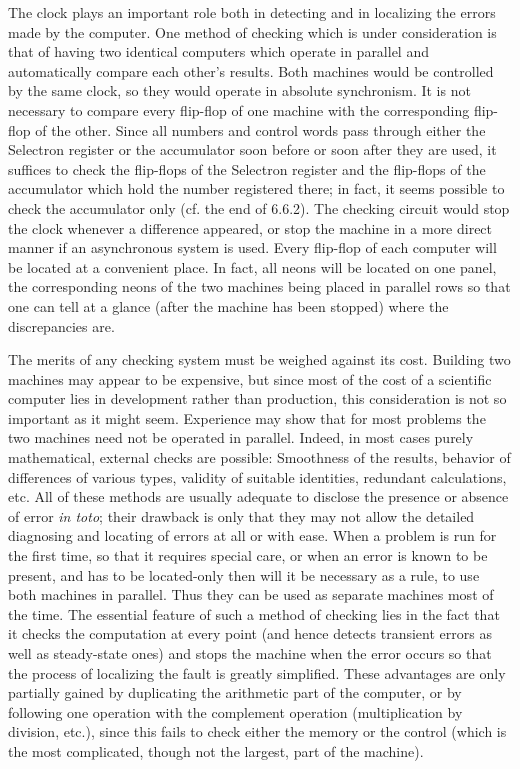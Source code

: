 \documentclass[12pt]{amsart}
\begin{document}
The clock plays an important role both in detecting and in localizing the errors made by the computer. One method of checking which is under consideration is that of having two identical computers which operate in parallel and automatically compare each other's results. Both machines would be controlled by the same clock, so they would operate in absolute synchronism. It is not necessary to compare every flip-flop of one machine with the corresponding flip-flop of the other. Since all numbers and control words pass through either the Selectron register or the accumulator soon before or soon after they are used, it suffices to check the flip-flops of the Selectron register and the flip-flops of the accumulator which hold the number registered there; in fact, it seems possible to check the accumulator only (cf. the end of 6.6.2). The checking circuit would stop the clock whenever a difference appeared, or stop the machine in a more direct manner if an asynchronous system is used. Every flip-flop of each computer will be located at a convenient place. In fact, all neons will be located on one panel, the corresponding neons of the two machines being placed in parallel rows so that one can tell at a glance (after the machine has been stopped) where the discrepancies are.

The merits of any checking system must be weighed against its cost. Building two machines may appear to be expensive, but since most of the cost of a scientific computer lies in development rather than production, this consideration is not so important as it might seem. Experience may show that for most problems the two machines need not be operated in parallel. Indeed, in most cases purely mathematical, external checks are possible: Smoothness of the results, behavior of differences of various types, validity of suitable identities, redundant calculations, etc. All of these methods are usually adequate to disclose the presence or absence of error \emph{in toto}; their drawback is only that they may not allow the detailed diagnosing and locating of errors at all or with ease. When a problem is run for the first time, so that it requires special care, or when an error is known to be present, and has to be located-only then will it be necessary as a rule, to use both machines in parallel. Thus they can be used as separate machines most of the time. The essential feature of such a method of checking lies in the fact that it checks the computation at every point (and hence detects transient errors as well as steady-state ones) and stops the machine when the error occurs so that the process of localizing the fault is greatly simplified. These advantages are only partially gained by duplicating the arithmetic part of the computer, or by following one operation with the complement operation (multiplication by division, etc.), since this fails to check either the memory or the control (which is the most complicated, though not the largest, part of the machine).
\end{document}
